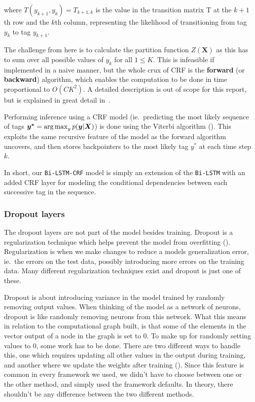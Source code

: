 where $T(y_{k+1}, y_{k}) = T_{k+1,k}$ is the value in the transition matrix T at
the $k+1$th row and the $k$th column, representing the likelihood of
transitioning from tag $y_{k}$ to tag $y_{k+1}$.

The challenge from here is to calculate the partition function $Z(\bm{X})$ as
this has to sum over all possible values of $y_{k}$ for all $1 \leq K$. This is
infeasible if implemented in a naive manner, but the whole crux of CRF is the
\textbf{forward} (or \textbf{backward}) algorithm, which enables the computation
to be done in time proportional to $O(CK^{2})$. A detailed description is out of
scope for this report, but is explained in great detail
in~\cite{sutton2012introduction}.

Performing inference using a CRF model (ie.\ predicting the most likely sequence
of tags $\bm{y^{*}} = \operatorname*{arg\,max}_{y}p(\bm{y}|\bm{X})$) is done using the Viterbi
algorithm (\cite{sutton2012introduction}). This exploits the same
recursive feature of the model as the forward algorithm uncovers, and then
stores backpointers to the most likely tag $y^{*}$ at each time step $k$.

In short, our \texttt{Bi-LSTM-CRF} model is simply an extension of the
\texttt{Bi-LSTM} with an added CRF layer for modeling the conditional
dependencies between each successive tag in the sequence.

\subsubsection{Dropout layers}

The dropout layers are not part of the model besides training. Dropout is a
regularization technique which helps prevent the model from overfitting
(\cite[Chapter~7]{goodfellow2016deep}). Regularization is when we make changes
to reduce a models generalization error, ie.\ the errors on the test data,
possibly introducing more errors on the training data. Many different
regularization techniques exist and dropout is just one of these.

Dropout is about introducing variance in the model trained by randomly removing
output values. When thinking of the model as a network of neurons, dropout is
like randomly removing neurons from this network. What this means in relation to
the computational graph built, is that some of the elements in the vector output
of a node in the graph is set to 0. To make up for randomly setting values to 0,
some work has to be done. There are two different ways to handle this, one which
requires updating all other values in the output during training, and another
where we update the weights after training (\cite{goodfellow2016deep}). Since
this feature is common in every framework we used, we didn't have to choose
between one or the other method, and simply used the framework defaults. In
theory, there shouldn't be any difference between the two different methods.

